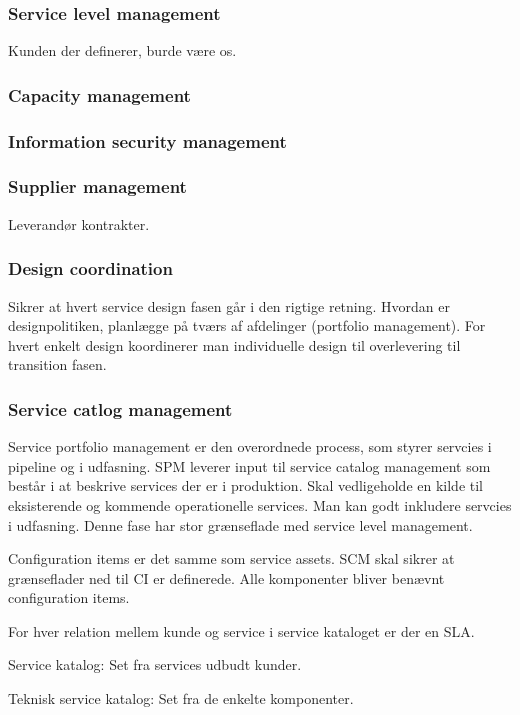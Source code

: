 \subsubsection{Service level management}
Kunden der definerer, burde være os.

\subsubsection{Capacity management}


\subsubsection{Information security management}

\subsubsection{Supplier management}
Leverandør kontrakter.

\subsubsection{Design coordination}
Sikrer at hvert service design fasen går i den rigtige retning. Hvordan er designpolitiken, planlægge på tværs af afdelinger (portfolio management). For hvert enkelt design koordinerer man individuelle design til overlevering til transition fasen.

\subsubsection{Service catlog management}
Service portfolio management er den overordnede process, som styrer servcies i pipeline og i udfasning. SPM leverer input til service catalog management som består i at beskrive services der er i produktion. Skal vedligeholde en kilde til eksisterende og kommende operationelle services. Man kan godt inkludere servcies i udfasning. Denne fase har stor grænseflade med service level management.

Configuration items er det samme som service assets. SCM skal sikrer at grænseflader ned til CI er definerede. Alle komponenter bliver benævnt configuration items.

For hver relation mellem kunde og service i service kataloget er der en SLA.

Service katalog: Set fra services udbudt kunder.

Teknisk service katalog: Set fra de enkelte komponenter.

